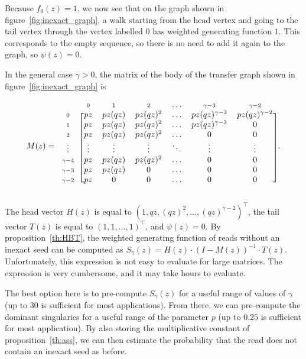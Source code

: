 \documentclass{article}
\begin{document}
Because $f_0(z) = 1$, we now see that on the graph shown in
figure~\ref{fig:inexact_graph}, a walk starting from the head vertex and
going to the tail vertex through the vertex labelled $0$ has weighted
generating function $1$. This corresponds to the empty sequence, so there
is no need to add it again to the graph, so $\psi(z) = 0$.

In the general case $\gamma > 0$, the matrix of the body of the transfer
graph shown in figure~\ref{fig:inexact_graph} is

\begin{equation*}
M(z) = 
\begin{blockarray}{ccccccc}
       & \scriptstyle{0} & \scriptstyle{1} & \scriptstyle{2} &
    \ldots &  \scriptstyle{\gamma-3} & \scriptstyle{\gamma-2} \\
\begin{block}{c[cccccc]}
\scriptstyle{0} & pz  & pz(qz) & pz(qz)^2 & \ldots &
    pz(qz)^{\gamma-3} & pz(qz)^{\gamma-2} \\
\scriptstyle{1} & pz  & pz(qz) & pz(qz)^2 & \ldots &
    pz(qz)^{\gamma-3} & 0 \\
\scriptstyle{2} & pz  & pz(qz) & pz(qz)^2 & \ldots &
    0 & 0 \\
\vdots & \vdots  & \vdots & \vdots & \ddots & \vdots & \vdots  \\
\scriptstyle{\gamma-4} & pz  & pz(qz) & pz(qz)^2 & \ldots & 0 & 0 \\
\scriptstyle{\gamma-3} & pz  & pz(qz) & 0 & \ldots & 0 & 0 \\
\scriptstyle{\gamma-2} & pz  & 0      & 0 & \ldots & 0 & 0 \\
\end{block}
\end{blockarray}.
\end{equation*}


The head vector $H(z)$ is equal to $(1, qz, (qz)^2, \ldots,
(qz)^{\gamma-2})^\top$, the tail vector $T(z)$ is equal to $(1,1, \ldots,
1)^\top$, and $\psi(z) = 0$. By proposition~\ref{th:HBT}, the weighted
generating function of reads without an inexact seed can be computed as
$S_\gamma(z) = H(z) \cdot (I-M(z))^{-1} \cdot T(z)$. Unfortunately, this
expression is not easy to evaluate for large matrices. The expression is
very cumbersome, and it may take hours to evaluate.

The best option here is to pre-compute $S_\gamma(z)$ for a useful range of
values of $\gamma$ (up to $30$ is sufficient for most applications). From
there, we can pre-compute the dominant singularies for a useful range of
the parameter $p$ (up to $0.25$ is sufficient for most application). By
also storing the multiplicative constant of proposition~\ref{th:ass}, we
can then estimate the probability that the read does not contain an
inexact seed as before.
\end{document}
